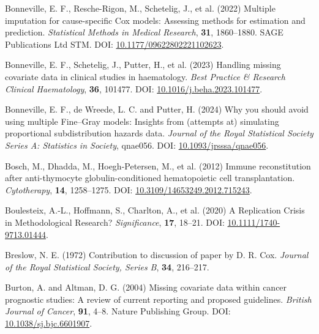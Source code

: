 \documentclass[
  letterpaper,
  DIV=11,
  numbers=noendperiod]{scrreprt}
\newlength{\cslhangindent}
\newenvironment{CSLReferences}[2] %
 {\begin{list}{}{%
  \setlength{\itemindent}{0pt}
  \setlength{\leftmargin}{0pt}
  \setlength{\parsep}{0pt}
  \ifodd #1
   \setlength{\leftmargin}{\cslhangindent}
   \setlength{\itemindent}{-1\cslhangindent}
  \fi
  \setlength{\itemsep}{#2\baselineskip}}}
 {\end{list}}
\begin{document}
\begin{CSLReferences}{1}{1}
Bonneville, E. F., Resche-Rigon, M., Schetelig, J., et al. (2022)
Multiple imputation for cause-specific {Cox} models: {Assessing} methods
for estimation and prediction. \emph{Statistical Methods in Medical
Research}, \textbf{31}, 1860--1880. SAGE Publications Ltd STM. DOI:
\href{https://doi.org/10.1177/09622802221102623}{10.1177/09622802221102623}.

Bonneville, E. F., Schetelig, J., Putter, H., et al. (2023) Handling
missing covariate data in clinical studies in haematology. \emph{Best
Practice \& Research Clinical Haematology}, \textbf{36}, 101477. DOI:
\href{https://doi.org/10.1016/j.beha.2023.101477}{10.1016/j.beha.2023.101477}.

Bonneville, E. F., de Wreede, L. C. and Putter, H. (2024) Why you should
avoid using multiple {Fine}--{Gray} models: Insights from (attempts at)
simulating proportional subdistribution hazards data. \emph{Journal of
the Royal Statistical Society Series A: Statistics in Society}, qnae056.
DOI:
\href{https://doi.org/10.1093/jrsssa/qnae056}{10.1093/jrsssa/qnae056}.

Bosch, M., Dhadda, M., Hoegh-Petersen, M., et al. (2012) Immune
reconstitution after anti-thymocyte globulin-conditioned hematopoietic
cell transplantation. \emph{Cytotherapy}, \textbf{14}, 1258--1275. DOI:
\href{https://doi.org/10.3109/14653249.2012.715243}{10.3109/14653249.2012.715243}.

Boulesteix, A.-L., Hoffmann, S., Charlton, A., et al. (2020) A
{Replication Crisis} in {Methodological Research}? \emph{Significance},
\textbf{17}, 18--21. DOI:
\href{https://doi.org/10.1111/1740-9713.01444}{10.1111/1740-9713.01444}.

Breslow, N. E. (1972) Contribution to discussion of paper by {D}. {R}.
{Cox}. \emph{Journal of the Royal Statistical Society, Series B},
\textbf{34}, 216--217.

Burton, A. and Altman, D. G. (2004) Missing covariate data within cancer
prognostic studies: A review of current reporting and proposed
guidelines. \emph{British Journal of Cancer}, \textbf{91}, 4--8. Nature
Publishing Group. DOI:
\href{https://doi.org/10.1038/sj.bjc.6601907}{10.1038/sj.bjc.6601907}.


\end{CSLReferences}
\end{document}
